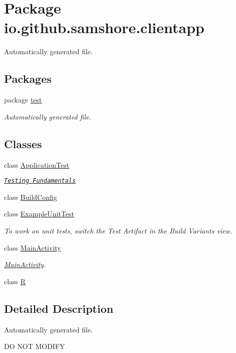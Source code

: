\hypertarget{namespaceio_1_1github_1_1samshore_1_1clientapp}{}\section{Package io.\+github.\+samshore.\+clientapp}
\label{namespaceio_1_1github_1_1samshore_1_1clientapp}


Automatically generated file.  


\subsection*{Packages}
\begin{DoxyCompactItemize}
\item 
package \hyperlink{namespaceio_1_1github_1_1samshore_1_1clientapp_1_1test}{test}
\begin{DoxyCompactList}\small\item\em Automatically generated file. \end{DoxyCompactList}\end{DoxyCompactItemize}
\subsection*{Classes}
\begin{DoxyCompactItemize}
\item 
class \hyperlink{classio_1_1github_1_1samshore_1_1clientapp_1_1_application_test}{Application\+Test}
\begin{DoxyCompactList}\small\item\em \href{http://d.android.com/tools/testing/testing_android.html}{\tt Testing Fundamentals} \end{DoxyCompactList}\item 
class \hyperlink{classio_1_1github_1_1samshore_1_1clientapp_1_1_build_config}{Build\+Config}
\item 
class \hyperlink{classio_1_1github_1_1samshore_1_1clientapp_1_1_example_unit_test}{Example\+Unit\+Test}
\begin{DoxyCompactList}\small\item\em To work on unit tests, switch the Test Artifact in the Build Variants view. \end{DoxyCompactList}\item 
class \hyperlink{classio_1_1github_1_1samshore_1_1clientapp_1_1_main_activity}{Main\+Activity}
\begin{DoxyCompactList}\small\item\em \hyperlink{classio_1_1github_1_1samshore_1_1clientapp_1_1_main_activity}{Main\+Activity}. \end{DoxyCompactList}\item 
class \hyperlink{classio_1_1github_1_1samshore_1_1clientapp_1_1_r}{R}
\end{DoxyCompactItemize}


\subsection{Detailed Description}
Automatically generated file. 

DO N\+OT M\+O\+D\+I\+FY 